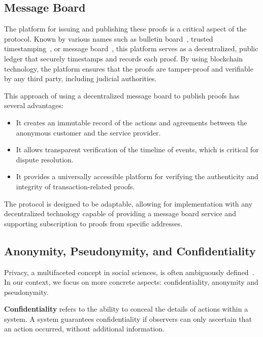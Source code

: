 \documentclass[pdftex,twocolumn,epjc3]{svjour3}
\begin{document}
\subsection{Message Board}\label{sec:message-board}
The platform for issuing and publishing these proofs is a critical aspect of the protocol. Known by various names such as bulletin board~\cite{achenbachImprovedCoercionresistantElectronic2015}, trusted timestamping~\cite{gippDecentralizedTrustedTimestamping2015}, or message board~\cite{hinarejosSolutionSecureCertified2019}, this platform serves as a decentralized, public ledger that securely timestamps and records each proof. By using blockchain technology, the platform ensures that the proofs are tamper-proof and verifiable by any third party, including judicial authorities.

This approach of using a decentralized message board to publish proofs has several advantages:
\begin{itemize}
  \item It creates an immutable record of the actions and agreements between the anonymous customer and the service provider.
  \item It allows transparent verification of the timeline of events, which is critical for dispute resolution.
\item It provides a universally accessible platform for verifying the authenticity and integrity of transaction-related proofs.
\end{itemize}

The protocol is designed to be adaptable, allowing for implementation with any decentralized technology capable of providing a message board service and supporting subscription to proofs from specific addresses.

\subsection{Anonymity, Pseudonymity, and Confidentiality}\label{sec:pseudo-anon}

\begin{sloppypar}
Privacy, a multifaceted concept in social sciences, is often ambiguously defined~\cite{smithInformationPrivacyResearch2011}. In our context, we focus on more concrete aspects: confidentiality, anonymity and pseudonymity.
\end{sloppypar}

\textbf{Confidentiality} refers to the ability to conceal the details of actions within a system. A system guarantees confidentiality if observers can only ascertain that an action occurred, without additional information.
\end{document}
